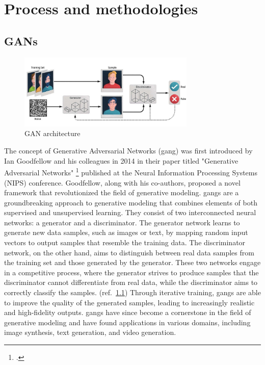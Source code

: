 \chapter{Process and methodologies}
\label{cap:process-methodologies}

\section{GANs}
\label{sec:gans}
\begin{figure}[H]
    \centering
    \includegraphics[width=0.75\textwidth]{images/model/gan-architecture}
    \caption{GAN architecture}\label{fig:gan-architecture}
\end{figure}

The concept of Generative Adversarial Networks (\gls{gang}) was first introduced by Ian Goodfellow and his colleagues in 2014 in their paper titled "Generative Adversarial Networks" \footcite{paper:ganpaper} published at the Neural Information Processing Systems (NIPS) conference. 
Goodfellow, along with his co-authors, proposed a novel framework that revolutionized the field of generative modeling. 
\gls{gang}s are a groundbreaking approach to generative modeling that combines elements of both supervised and unsupervised learning. 
They consist of two interconnected neural networks: a generator and a discriminator. 
The generator network learns to generate new data samples, such as images or text, by mapping random input vectors to output samples that resemble the training data. 
The discriminator network, on the other hand, aims to distinguish between real data samples from the training set and those generated by the generator. 
These two networks engage in a competitive process, where the generator strives to produce samples that the discriminator cannot differentiate from real data, while the discriminator aims to correctly classify the samples. (ref.~\ref{fig:gan-architecture}) 
Through iterative training, \gls{gang}s are able to improve the quality of the generated samples, leading to increasingly realistic and high-fidelity outputs. 
\gls{gang}s have since become a cornerstone in the field of generative modeling and have found applications in various domains, including image synthesis, text generation, and video generation. 



